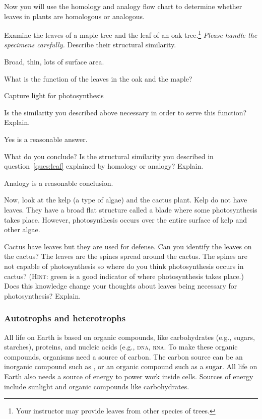 \documentclass[12pt, hidelinks]{exam}
\newcommand*\AnswerBox[2]{%
    \parbox[t][#1]{0.92\textwidth}{%
    \begin{solution}#2\end{solution}}
    \vspace{\stretch{1}}
}
\begin{document}
\begin{questions}
Now you will use the homology and analogy flow chart to determine whether leaves in plants are homologous or analogous.

\question\label{ques:leaf}
Examine the leaves of a maple tree and the leaf of
an oak tree.\footnote{Your instructor may provide leaves from other species of trees.} \emph{Please
handle the specimens carefully.} Describe their structural similarity.

\AnswerBox{3\baselineskip}{Broad, thin, lots of surface area.}

\question
What is the function of the leaves in the oak and the maple?

\AnswerBox{3\baselineskip}{Capture light for photosynthesis}

\question
Is the similarity you described above necessary in order to serve
this function? Explain. 

\AnswerBox{3\baselineskip}{Yes is a reasonable answer.}

\question
What do you conclude? Is the structural similarity you described in
question~\ref{ques:leaf} explained by homology or analogy? Explain.

\AnswerBox{3\baselineskip}{Analogy is a reasonable conclusion.}

\question
Now, look at the kelp (a type of algae) and the cactus plant. Kelp do 
not have leaves. They have a broad flat structure called a blade where
some photosynthesis takes place. However, photosynthesis occurs over
the entire surface of kelp and other algae.

Cactus have leaves but they are used for defense. Can you identify the leaves on the
cactus? The leaves are the spines spread around the cactus. The spines are not
capable of photosynthesis so where do you think photosynthesis occurs in cactus? 
(\textsc{Hint:} green is a good indicator of where photosynthesis takes place.)
Does this knowledge change your thoughts about leaves being necessary for
photosynthesis? Explain. %

\AnswerBox{5\baselineskip}{}

\subsubsection*{Autotrophs and heterotrophs}

All life on Earth is based on organic compounds, like carbohydrates (e.g., sugars, starches), proteins, and nucleic acids (e.g., \textsc{dna, rna}. To make these organic compounds, organisms need a source of carbon. The carbon source can be an inorganic compound such as , or an organic compound such as a sugar.  All life on Earth also needs a source of energy to power work inside cells. Sources of energy include sunlight and organic compounds like carbohydrates.


\end{questions}
\end{document}
